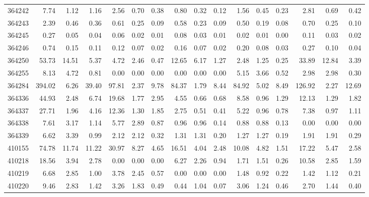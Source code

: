 \begin{sidewaystable}[!htbp]
{\begin{tabular}{r|rrr|rrr|rrr|rrr|rrr}
      364242&7.74&1.12&1.16&2.56&0.70&0.38&0.80&0.32&0.12&1.56&0.45&0.23&2.81&0.69&0.42\\
      
      364243&2.39&0.46&0.36&0.61&0.25&0.09&0.58&0.23&0.09&0.50&0.19&0.08&0.70&0.25&0.10\\
      
      364245&0.27&0.05&0.04&0.06&0.02&0.01&0.08&0.03&0.01&0.02&0.01&0.00&0.11&0.03&0.02\\
      
      364246&0.74&0.15&0.11&0.12&0.07&0.02&0.16&0.07&0.02&0.20&0.08&0.03&0.27&0.10&0.04\\
      
      364250&53.73&14.51&5.37&4.72&2.46&0.47&12.65&6.17&1.27&2.48&1.25&0.25&33.89&12.84&3.39\\
      
      364255&8.13&4.72&0.81&0.00&0.00&0.00&0.00&0.00&0.00&5.15&3.66&0.52&2.98&2.98&0.30\\
      
      364284&394.02&6.26&39.40&97.81&2.37&9.78&84.37&1.79&8.44&84.92&5.02&8.49&126.92&2.27&12.69\\
      
      364336&44.93&2.48&6.74&19.68&1.77&2.95&4.55&0.66&0.68&8.58&0.96&1.29&12.13&1.29&1.82\\
      
      364337&27.71&1.96&4.16&12.36&1.30&1.85&2.75&0.51&0.41&5.22&0.96&0.78&7.38&0.97&1.11\\
      
      364338&7.61&3.17&1.14&5.77&2.89&0.87&0.96&0.96&0.14&0.88&0.88&0.13&0.00&0.00&0.00\\
      
      364339&6.62&3.39&0.99&2.12&2.12&0.32&1.31&1.31&0.20&1.27&1.27&0.19&1.91&1.91&0.29\\
      
      410155&74.78&11.74&11.22&30.97&8.27&4.65&16.51&4.04&2.48&10.08&4.82&1.51&17.22&5.47&2.58\\
      
      410218&18.56&3.94&2.78&0.00&0.00&0.00&6.27&2.26&0.94&1.71&1.51&0.26&10.58&2.85&1.59\\
      
      410219&6.68&2.85&1.00&3.78&2.45&0.57&0.00&0.00&0.00&1.48&0.92&0.22&1.42&1.12&0.21\\
      
      410220&9.46&2.83&1.42&3.26&1.83&0.49&0.44&1.04&0.07&3.06&1.24&0.46&2.70&1.44&0.40\\
      

\end{tabular}}
\end{sidewaystable}
